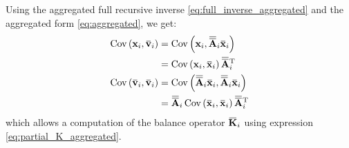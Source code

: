 \documentclass[12pt]{scrartcl}
\newcommand{\overbar}[1]{\mkern 1.5mu\overline{\mkern-1.5mu#1\mkern-1.5mu}\mkern 1.5mu}
\DeclareMathOperator{\Cov}{Cov}
\begin{document}
Using the aggregated full recursive inverse \eqref{eq:full_inverse_aggregated} and the aggregated form \eqref{eq:aggregated}, we get:
\begin{subequations}
\begin{align}
\Cov\left(\mathbf{x}_i, \overbar{\mathbf{v}}_i\right) & = \Cov\left(\mathbf{x}_i, \overbar{\overbar{\mathbf{A}}}_i \overbar{\mathbf{x}}_i\right) \nonumber \\
 & = \Cov\left(\mathbf{x}_i, \overbar{\mathbf{x}}_i\right) \overbar{\overbar{\mathbf{A}}}_i^\mathrm{T} \\
\Cov\left(\overbar{\mathbf{v}}_i, \overbar{\mathbf{v}}_i\right) & = \Cov\left(\overbar{\overbar{\mathbf{A}}}_i \overbar{\mathbf{x}}_i, \overbar{\overbar{\mathbf{A}}}_i \overbar{\mathbf{x}}_i\right) \nonumber \\
 & = \overbar{\overbar{\mathbf{A}}}_i \Cov\left(\overbar{\mathbf{x}}_i,  \overbar{\mathbf{x}}_i\right) \overbar{\overbar{\mathbf{A}}}_i^\mathrm{T}
\end{align}
\end{subequations}
which allows a computation of the balance operator $\overbar{\mathbf{K}}_i$ using expression \eqref{eq:partial_K_aggregated}.
\end{document}
